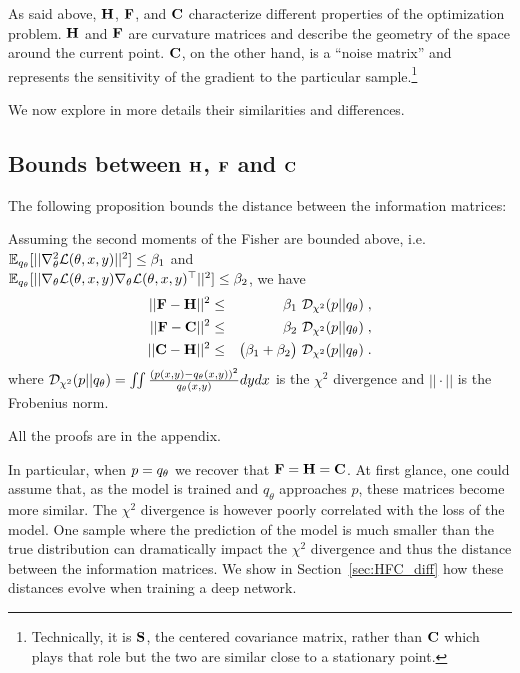 As said above, ${\mathbf{H}}$, ${\mathbf{F}}$, and ${\mathbf{C}}$ characterize different properties of the optimization problem. ${\mathbf{H}}$ and ${\mathbf{F}}$ are curvature matrices and describe the geometry of the space around the current point. ${\mathbf{C}}$, on the other hand, is a ``noise matrix'' and represents the sensitivity of the gradient to the particular sample.\footnote{Technically, it is ${\mathbf{S}}$, the centered covariance matrix, rather than ${\mathbf{C}}$ which plays that role but the two are similar close to a stationary point.}

We now explore in more details their similarities and differences.

\subsection{Bounds between \texorpdfstring{${\mathbf{H}}$}{H}, \texorpdfstring{${\mathbf{F}}$}{F} and \texorpdfstring{${\mathbf{C}}$}{C}}
The following proposition bounds the distance between the information matrices:


\begin{proposition}
Assuming the second moments of the Fisher are bounded above, i.e. $ \mathbb{E}_{q_\theta} [ ||\nabla_\theta^2 \mathcal{L}(\theta, x, y)||^2] \leq \beta_1$ and \\ $\mathbb{E}_{q_\theta} [ ||\nabla_\theta \mathcal{L}(\theta, x, y) \nabla_\theta \mathcal{L}(\theta, x, y)^\top||^2] \leq \beta_2$, we have
\begin{eqnarray*}
||\rmF - \rmH||^2 &\le& \beta_1 \ \gD_{\chi^2}(p||\q) \; ,\\
||\rmF - \rmC||^2 &\le&  \beta_2 \ \gD_{\chi^2}(p||\q) \; ,\\
||\rmC - \rmH||^2 &\le&  \big(\beta_1 + \beta_2\big) \ \gD_{\chi^2}(p||\q) \; .
\end{eqnarray*}
where ${\mathcal{D}}_{\chi^2}(p||q_\theta) = \iint \tfrac{(p(x, y)-q_\theta(x, y))^2}{q_\theta(x, y)} dy dx $ is the $\chi^2$ divergence and $|| \cdot ||$ is the Frobenius norm.
\end{proposition}
All the proofs are in the appendix.

In particular, when $p = q_\theta$ we recover that ${\mathbf{F}} = {\mathbf{H}} = {\mathbf{C}}$. At first glance, one could assume that, as the model is trained and $q_\theta$ approaches $p$, these matrices become more similar. The $\chi^2$ divergence is however poorly correlated with the loss of the model. One sample where the prediction of the model is much smaller than the true distribution can dramatically impact the $\chi^2$ divergence and thus the distance between the information matrices. We show in Section~\ref{sec:HFC_diff} how these distances evolve when training a deep network.

